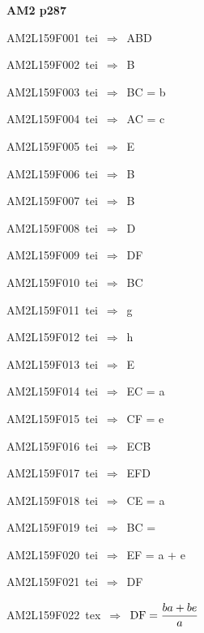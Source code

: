 \par\vfill\eject
{\bf\hfill AM2 p287\hfill\hbox{}}\par\bigskip
{\sixrm AM2L159F001\ {\sixit tei}\ }$\Rightarrow$\ ABD\par\smallskip
{\sixrm AM2L159F002\ {\sixit tei}\ }$\Rightarrow$\ B\par\smallskip
{\sixrm AM2L159F003\ {\sixit tei}\ }$\Rightarrow$\ BC = {\tenit b}\par\smallskip
{\sixrm AM2L159F004\ {\sixit tei}\ }$\Rightarrow$\ AC = {\tenit c}\par\smallskip
{\sixrm AM2L159F005\ {\sixit tei}\ }$\Rightarrow$\ E\par\smallskip
{\sixrm AM2L159F006\ {\sixit tei}\ }$\Rightarrow$\ B\par\smallskip
{\sixrm AM2L159F007\ {\sixit tei}\ }$\Rightarrow$\ B\par\smallskip
{\sixrm AM2L159F008\ {\sixit tei}\ }$\Rightarrow$\ D\par\smallskip
{\sixrm AM2L159F009\ {\sixit tei}\ }$\Rightarrow$\ DF\par\smallskip
{\sixrm AM2L159F010\ {\sixit tei}\ }$\Rightarrow$\ BC\par\smallskip
{\sixrm AM2L159F011\ {\sixit tei}\ }$\Rightarrow$\ {\tenit g}\par\smallskip
{\sixrm AM2L159F012\ {\sixit tei}\ }$\Rightarrow$\ {\tenit h}\par\smallskip
{\sixrm AM2L159F013\ {\sixit tei}\ }$\Rightarrow$\ E\par\smallskip
{\sixrm AM2L159F014\ {\sixit tei}\ }$\Rightarrow$\ EC = {\tenit a}\par\smallskip
{\sixrm AM2L159F015\ {\sixit tei}\ }$\Rightarrow$\ CF = {\tenit e}\par\smallskip
{\sixrm AM2L159F016\ {\sixit tei}\ }$\Rightarrow$\ ECB\par\smallskip
{\sixrm AM2L159F017\ {\sixit tei}\ }$\Rightarrow$\ EFD\par\smallskip
{\sixrm AM2L159F018\ {\sixit tei}\ }$\Rightarrow$\ CE = {\tenit a}\par\smallskip
{\sixrm AM2L159F019\ {\sixit tei}\ }$\Rightarrow$\ BC =\par\smallskip
{\sixrm AM2L159F020\ {\sixit tei}\ }$\Rightarrow$\ EF = {\tenit a} + {\tenit e}\par\smallskip
{\sixrm AM2L159F021\ {\sixit tei}\ }$\Rightarrow$\ DF\par\smallskip
{\sixrm AM2L159F022\ {\sixit tex}\ }$\Rightarrow$\ ${\rm DF} = {\displaystyle\strut {ba + be}\over \displaystyle\strut a}$\par\smallskip


